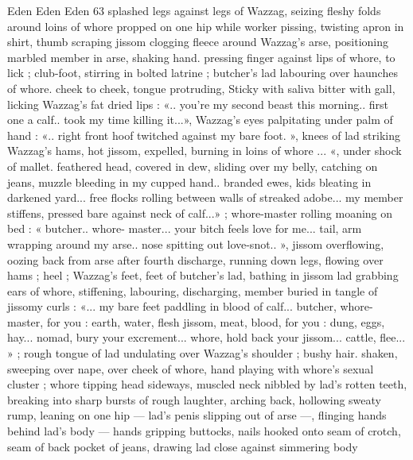 Eden Eden Eden 63
splashed legs against legs of Wazzag, seizing fleshy folds around
loins of whore propped on one hip while worker pissing, twisting
apron in shirt, thumb scraping jissom clogging fleece around
Wazzag's arse, positioning marbled member in arse, shaking hand.
pressing finger against lips of whore, to lick ; club-foot, stirring in
bolted latrine ; butcher's lad labouring over haunches of whore.
cheek to cheek, tongue protruding, Sticky with saliva bitter with gall,
licking Wazzag's fat dried lips : «.. you're my second beast this
morning.. first one a calf.. took my time killing it...», Wazzag's eyes
palpitating under palm of hand : «.. right front hoof twitched against
my bare foot. », knees of lad striking Wazzag's hams, hot jissom,
expelled, burning in loins of whore ... «, under shock of mallet.
feathered head, covered in dew, sliding over my belly, catching on
jeans, muzzle bleeding in my cupped hand.. branded ewes, kids
bleating in darkened yard... free flocks rolling between walls of
streaked adobe... my member stiffens, pressed bare against neck of
calf...» ; whore-master rolling moaning on bed : « butcher.. whore-
master... your bitch feels love for me... tail, arm wrapping around my
arse.. nose spitting out love-snot.. », jissom overflowing, oozing back
from arse after fourth discharge, running down legs, flowing over
hams ; heel ; Wazzag's feet, feet of butcher's lad, bathing in jissom
lad grabbing ears of whore, stiffening, labouring, discharging,
member buried in tangle of jissomy curls : «... my bare feet paddling
in blood of calf... butcher, whore-master, for you : earth, water, flesh
jissom, meat, blood, for you : dung, eggs, hay... nomad, bury your
excrement... whore, hold back your jissom... cattle, flee... » ; rough
tongue of lad undulating over Wazzag's shoulder ; bushy hair.
shaken, sweeping over nape, over cheek of whore, hand playing with
whore’s sexual cluster ; whore tipping head sideways, muscled neck
nibbled by lad's rotten teeth, breaking into sharp bursts of rough
laughter, arching back, hollowing sweaty rump, leaning on one hip —
lad's penis slipping out of arse —, flinging hands behind lad's body
— hands gripping buttocks, nails hooked onto seam of crotch, seam
of back pocket of jeans, drawing lad close against simmering body

